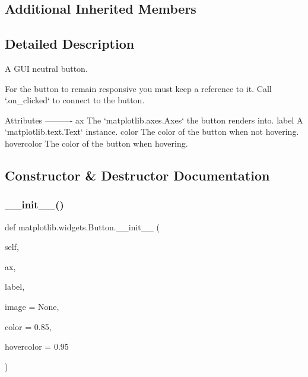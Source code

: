 \subsection*{Additional Inherited Members}


\subsection{Detailed Description}
\begin{DoxyVerb}A GUI neutral button.

For the button to remain responsive you must keep a reference to it.
Call `.on_clicked` to connect to the button.

Attributes
----------
ax
    The `matplotlib.axes.Axes` the button renders into.
label
    A `matplotlib.text.Text` instance.
color
    The color of the button when not hovering.
hovercolor
    The color of the button when hovering.
\end{DoxyVerb}
 

\subsection{Constructor \& Destructor Documentation}
\mbox{\label{classmatplotlib_1_1widgets_1_1Button_afa231cff67815d2f86396e85bf96237e}} 
\subsubsection{\texorpdfstring{\+\_\+\+\_\+init\+\_\+\+\_\+()}{\_\_init\_\_()}}
{\footnotesize\ttfamily def matplotlib.\+widgets.\+Button.\+\_\+\+\_\+init\+\_\+\+\_\+ (\begin{DoxyParamCaption}\item[{}]{self,  }\item[{}]{ax,  }\item[{}]{label,  }\item[{}]{image = {\ttfamily None},  }\item[{}]{color = {\ttfamily \textquotesingle{}0.85\textquotesingle{}},  }\item[{}]{hovercolor = {\ttfamily \textquotesingle{}0.95\textquotesingle{}} }\end{DoxyParamCaption})}

